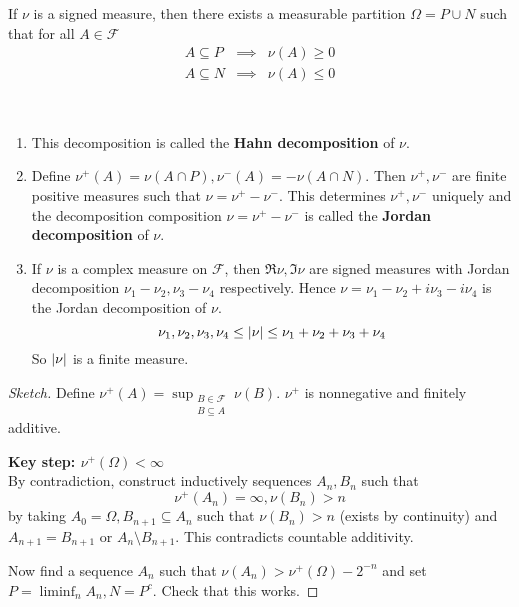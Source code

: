 \documentclass{article}
\begin{document}
\begin{nthm}\label{thm:hahn-decomp}
  If $\nu$ is a signed measure, then there exists a measurable partition $\Omega = P \cup N$ such that for all $A \in \mathcal F$
  \begin{eqnarray*}
    A \subseteq P & \implies & \nu(A) \ge 0 \\
    A \subseteq N & \implies & \nu(A) \le 0
  \end{eqnarray*}
\end{nthm}
\begin{rmks}~
  
  \begin{enumerate}
    \item This decomposition is called the {\bf Hahn decomposition} of $\nu$.
    \item Define $\nu^+(A) = \nu(A \cap P), \nu^-(A) = -\nu(A \cap N)$. Then $\nu^+, \nu^-$ are finite positive measures such that $\nu = \nu^+ - \nu^-$. This determines $\nu^+, \nu^-$ uniquely and the decomposition composition $\nu = \nu^+ - \nu^-$ is called the {\bf Jordan decomposition} of $\nu$.
    \item If $\nu$ is a complex measure on $\mathcal F$, then $\Re\nu, \Im\nu$ are signed measures with Jordan decomposition $\nu_1 - \nu_2, \nu_3 - \nu_4$ respectively. Hence $\nu = \nu_1 - \nu_2 + i\nu_3 - i\nu_4$ is the Jordan decomposition of $\nu$.
    $$\nu_1, \nu_2, \nu_3, \nu_4 \le \left\lvert \nu\right\rvert \le \nu_1 + \nu_2 + \nu_3 + \nu_4$$
    So $\left\lvert \nu\right\rvert$ is a finite measure.
  \end{enumerate}
\end{rmks}
\begin{proof}[Sketch]
  Define $\nu^+(A) = \sup_{\substack{B \in \mathcal F \\ B \subseteq A}} \nu(B)$. $\nu^+$ is nonnegative and finitely additive.

  {\bf Key step: $\nu^+(\Omega) < \infty$} \\
  By contradiction, construct inductively sequences $A_n, B_n$ such that
  $$\nu^+(A_n) = \infty, \nu(B_n) > n$$
  by taking $A_0 = \Omega, B_{n + 1} \subseteq A_n$ such that $\nu(B_n) > n$ (exists by continuity) and $A_{n + 1} = B_{n + 1}$ or $A_n \setminus B_{n + 1}$. This contradicts countable additivity.

  Now find a sequence $A_n$ such that $\nu(A_n) > \nu^+(\Omega) - 2^{-n}$ and set $P = \liminf_n A_n, N = P^c$. Check that this works.
\end{proof}

\newlec

\printindex
\end{document}
